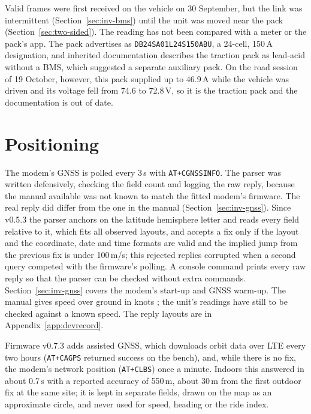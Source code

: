 Valid frames were first received on the vehicle on 30 September, but the link was intermittent (Section~\ref{sec:inv-bms}) until the unit was moved near the pack (Section~\ref{sec:two-sided}). The reading has not been compared with a meter or the pack's app. The pack advertises as \texttt{DB24SA01L24S150ABU}, a 24-cell, 150\,A designation, and inherited documentation describes the traction pack as lead-acid without a BMS, which suggested a separate auxiliary pack. On the road session of 19 October, however, this pack supplied up to 46.9\,A while the vehicle was driven and its voltage fell from 74.6 to 72.8\,V, so it is the traction pack and the documentation is out of date.

\section{Positioning}
\label{sec:impl-gnss}

The modem's GNSS is polled every 3\,s with \texttt{AT+CGNSSINFO}. The parser was written defensively, checking the field count and logging the raw reply, because the manual available \cite{simcoma76xx} was not known to match the fitted modem's firmware. The real reply did differ from the one in the manual (Section~\ref{sec:inv-gnss}). Since v0.5.3 the parser anchors on the latitude hemisphere letter and reads every field relative to it, which fits all observed layouts, and accepts a fix only if the layout and the coordinate, date and time formats are valid and the implied jump from the previous fix is under 100\,m/s; this rejected replies corrupted when a second query competed with the firmware's polling. A console command prints every raw reply so that the parser can be checked without extra commands. Section~\ref{sec:inv-gnss} covers the modem's start-up and GNSS warm-up. The manual gives speed over ground in knots \cite{simcoma76xx}; the unit's readings have still to be checked against a known speed. The reply layouts are in Appendix~\ref{app:devrecord}.

Firmware v0.7.3 adds assisted GNSS, which downloads orbit data over LTE every two hours (\texttt{AT+CAGPS} returned success on the bench), and, while there is no fix, the modem's network position (\texttt{AT+CLBS}) once a minute. Indoors this answered in about 0.7\,s with a reported accuracy of 550\,m, about 30\,m from the first outdoor fix at the same site; it is kept in separate fields, drawn on the map as an approximate circle, and never used for speed, heading or the ride index.

